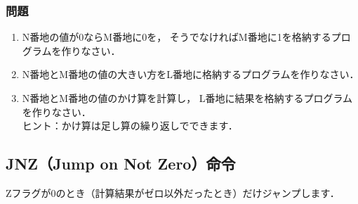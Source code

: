 \subsubsection{問題}
\begin{enumerate}
\item N番地の値が0ならM番地に0を，
  そうでなければM番地に1を格納するプログラムを作りなさい．
\item N番地とM番地の値の大きい方をL番地に格納するプログラムを作りなさい．
\item N番地とM番地の値のかけ算を計算し，
  L番地に結果を格納するプログラムを作りなさい．\\
  ヒント：かけ算は足し算の繰り返しでできます．
\end{enumerate}
\vfill

\subsection{JNZ（Jump on Not Zero）命令}
Zフラグが0のとき（計算結果がゼロ以外だったとき）だけジャンプします．

